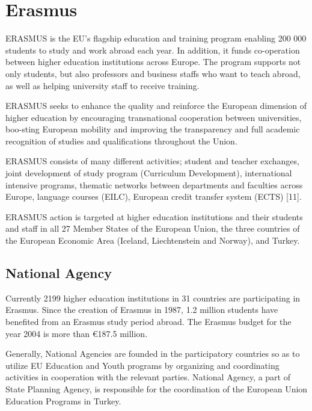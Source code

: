 \chapter{Erasmus}
ERASMUS is the EU's flagship education and training program enabling 200 000 students to study and work abroad each year. In addition, it funds co-operation between higher education institutions across Europe. The program supports not only students, but also professors and business staffs who want to teach abroad, as well as helping university staff to receive training.

ERASMUS seeks to enhance the quality and reinforce the European dimension of higher education by encouraging transnational cooperation between universities, boo-sting European mobility and improving the transparency and full academic recognition of studies and qualifications throughout the Union.

ERASMUS consists of many different activities; student and teacher exchanges, joint development of study program (Curriculum Development), international intensive programs, thematic networks between departments and faculties across Europe, language courses (EILC), European credit transfer system (ECTS) [11].

ERASMUS action is targeted at higher education institutions and their students and staff in all 27 Member States of the European Union, the three countries of the European Economic Area (Iceland, Liechtenstein and Norway), and Turkey.

\section{National Agency }
Currently 2199 higher education institutions in 31 countries are participating in Erasmus. Since the creation of Erasmus in 1987, 1.2 million students have benefited from an Erasmus study period abroad. The Erasmus budget for the year 2004 is more than \euro 187.5 million.

Generally, National Agencies are founded in the participatory countries so as to utilize EU Education and Youth programs by organizing and coordinating activities in cooperation with the relevant parties.
National Agency, a part of State Planning Agency, is responsible for the coordination of the European Union Education Programs in Turkey.

